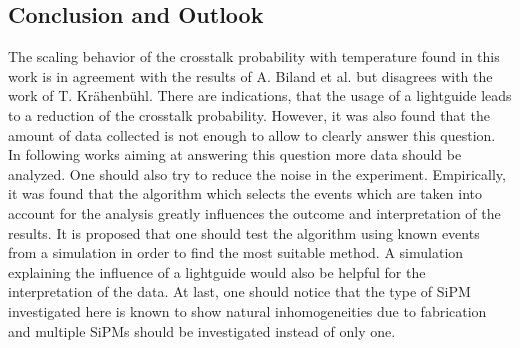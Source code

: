 \documentclass[10pt,a4paper]{article}
\begin{document}
\newpage
\begin{multicols}{2}
\section{Conclusion and Outlook}
The scaling behavior of the crosstalk probability with temperature found in this work is in agreement with the results of A. Biland et al. but disagrees with the work of T. Krähenbühl. There are indications, that the usage of a lightguide leads to a reduction of the crosstalk probability. However, it was also found that the amount of data collected is not enough to allow to clearly answer this question. In following works aiming at answering this question more data should be analyzed. One should also try to reduce the noise in the experiment. Empirically, it was found that the algorithm which selects the events which are taken into account for the analysis greatly influences the outcome and interpretation of the results. It is proposed that one should test the algorithm using known events from a simulation in order to find the most suitable method. A simulation explaining the influence of a lightguide would also be helpful for the interpretation of the data. At last, one should notice that the type of SiPM investigated here is known to show natural inhomogeneities due to fabrication and multiple SiPMs should be investigated instead of only one.
\end{multicols}
\end{document}
